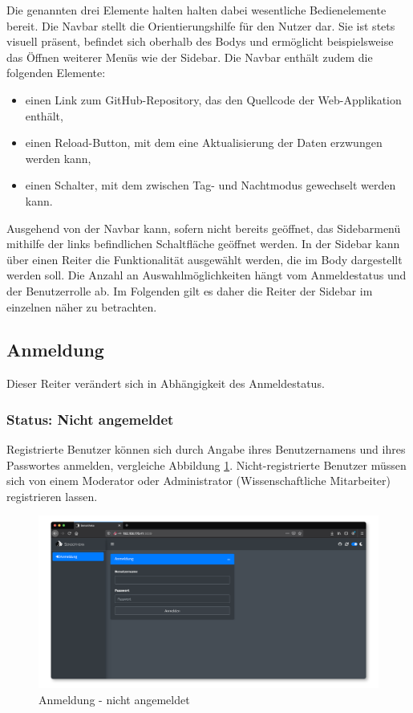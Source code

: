 \documentclass[
]{article}
\providecommand{\tightlist}{%
  \setlength{\itemsep}{0pt}\setlength{\parskip}{0pt}}
\begin{document}
Die genannten drei Elemente halten halten dabei wesentliche Bedienelemente bereit. Die Navbar stellt die Orientierungshilfe für den Nutzer dar. Sie ist stets visuell präsent, befindet sich oberhalb des Bodys und ermöglicht beispielsweise das Öffnen weiterer Menüs wie der Sidebar. Die Navbar enthält zudem die folgenden Elemente:

\begin{itemize}
\tightlist
\item
  einen Link zum GitHub-Repository, das den Quellcode der Web-Applikation enthält,
\item
  einen Reload-Button, mit dem eine Aktualisierung der Daten erzwungen werden kann,
\item
  einen Schalter, mit dem zwischen Tag- und Nachtmodus gewechselt werden kann.
\end{itemize}

Ausgehend von der Navbar kann, sofern nicht bereits geöffnet, das Sidebarmenü mithilfe der links befindlichen Schaltfläche geöffnet werden. In der Sidebar kann über einen Reiter die Funktionalität ausgewählt werden, die im Body dargestellt werden soll. Die Anzahl an Auswahlmöglichkeiten hängt vom Anmeldestatus und der Benutzerrolle ab. Im Folgenden gilt es daher die Reiter der Sidebar im einzelnen näher zu betrachten.

\hypertarget{login}{%
\subsection{Anmeldung}\label{login}}

Dieser Reiter verändert sich in Abhängigkeit des Anmeldestatus.

\hypertarget{status-nicht-angemeldet}{%
\subsubsection{Status: Nicht angemeldet}\label{status-nicht-angemeldet}}

Registrierte Benutzer können sich durch Angabe ihres Benutzernamens und ihres Passwortes anmelden, vergleiche Abbildung \ref{fig:login-mask}. Nicht-registrierte Benutzer müssen sich von einem Moderator oder Administrator (Wissenschaftliche Mitarbeiter) registrieren lassen.

\begin{figure}
\centering
\includegraphics{./img/login_mask.png}
\caption{\label{fig:login-mask}Anmeldung - nicht angemeldet}
\end{figure}
\end{document}
